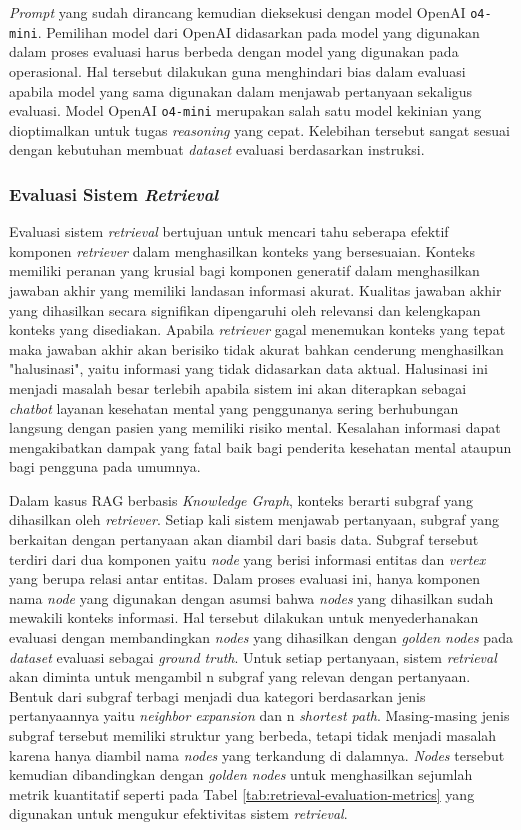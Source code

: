 \textit{Prompt} yang sudah dirancang kemudian dieksekusi dengan model OpenAI \texttt{o4-mini}.
Pemilihan model dari OpenAI didasarkan pada model yang digunakan dalam proses evaluasi harus berbeda dengan model yang digunakan pada operasional.
Hal tersebut dilakukan guna menghindari bias dalam evaluasi apabila model yang sama digunakan dalam menjawab pertanyaan sekaligus evaluasi.
Model OpenAI \texttt{o4-mini} merupakan salah satu model kekinian yang dioptimalkan untuk tugas \textit{reasoning} yang cepat.
Kelebihan tersebut sangat sesuai dengan kebutuhan membuat \textit{dataset} evaluasi berdasarkan instruksi.

\subsubsection{Evaluasi Sistem \textit{Retrieval}}
Evaluasi sistem \textit{retrieval} bertujuan untuk mencari tahu seberapa efektif komponen \textit{retriever} dalam menghasilkan konteks yang bersesuaian.
Konteks memiliki peranan yang krusial bagi komponen generatif dalam menghasilkan jawaban akhir yang memiliki landasan informasi akurat.
Kualitas jawaban akhir yang dihasilkan secara signifikan dipengaruhi oleh relevansi dan kelengkapan konteks yang disediakan.
Apabila \textit{retriever} gagal menemukan konteks yang tepat maka jawaban akhir akan berisiko tidak akurat bahkan cenderung menghasilkan "halusinasi", yaitu informasi yang tidak didasarkan data aktual.
Halusinasi ini menjadi masalah besar terlebih apabila sistem ini akan diterapkan sebagai \textit{chatbot} layanan kesehatan mental yang penggunanya sering berhubungan langsung dengan pasien yang memiliki risiko mental.
Kesalahan informasi dapat mengakibatkan dampak yang fatal baik bagi penderita kesehatan mental ataupun bagi pengguna pada umumnya.

Dalam kasus RAG berbasis \textit{Knowledge Graph}, konteks berarti subgraf yang dihasilkan oleh \textit{retriever}.
Setiap kali sistem menjawab pertanyaan, subgraf yang berkaitan dengan pertanyaan akan diambil dari basis data.
Subgraf tersebut terdiri dari dua komponen yaitu \textit{node} yang berisi informasi entitas dan \textit{vertex} yang berupa relasi antar entitas.
Dalam proses evaluasi ini, hanya komponen nama  \textit{node} yang digunakan dengan asumsi bahwa \textit{nodes} yang dihasilkan sudah mewakili konteks informasi.
Hal tersebut dilakukan untuk menyederhanakan evaluasi dengan membandingkan \textit{nodes} yang dihasilkan dengan \textit{golden nodes} pada \textit{dataset} evaluasi sebagai \textit{ground truth}.
Untuk setiap pertanyaan, sistem \textit{retrieval} akan diminta untuk mengambil n subgraf yang relevan dengan pertanyaan.
Bentuk dari subgraf terbagi menjadi dua kategori berdasarkan jenis pertanyaannya yaitu \textit{neighbor expansion} dan n \textit{shortest path}.
Masing-masing jenis subgraf tersebut memiliki struktur yang berbeda, tetapi tidak menjadi masalah karena hanya diambil nama \textit{nodes} yang terkandung di dalamnya.
\textit{Nodes} tersebut kemudian dibandingkan dengan \textit{golden nodes} untuk menghasilkan sejumlah metrik kuantitatif seperti pada Tabel \ref{tab:retrieval-evaluation-metrics} yang digunakan untuk mengukur efektivitas sistem \textit{retrieval}.

